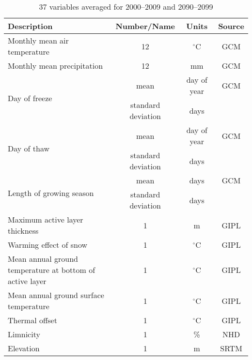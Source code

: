 \begin{table}
 \vskip-0.15in
 \scriptsize%
  \caption{37 variables averaged for 2000--2009 and 2090--2099}\label{tbl:characteristics}
  \centering
  \begin{tabular}{m{4.2cm}ccc}
   \toprule
   Description & Number/Name & Units & Source \\
   \midrule
   Monthly mean air temperature                   & 12                 & $^\circ$C   & GCM \\
   Monthly mean precipitation                     & 12                 & mm          & GCM \\
   \multirow{2}{*}{Day of freeze}                 & mean               & day of year & GCM \\
                                                  & standard deviation & days        & \\
   \multirow{2}{*}{Day of thaw}                   & mean               & day of year & GCM \\
                                                  & standard deviation & days        & \\
   \multirow{2}{*}{Length of growing season}      & mean               & days        & GCM \\
                                                  & standard deviation & days        & \\
   Maximum active layer thickness                 & 1                  & m           & GIPL \\
   Warming effect of snow                         & 1                  & $^\circ$C   & GIPL \\
   Mean annual ground temperature at bottom of active layer & 1                  & $^\circ$C   & GIPL \\
   Mean annual ground surface temperature         & 1                  & $^\circ$C   & GIPL \\
   Thermal offset                                 & 1                  & $^\circ$C   & GIPL \\
   Limnicity                                      & 1                  & \%          & NHD \\
   Elevation                                      & 1                  & m           & SRTM \\
   \bottomrule
  \end{tabular}
\end{table}
